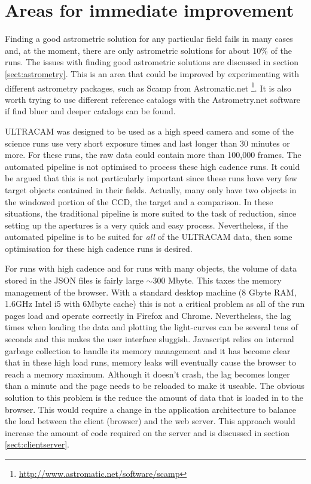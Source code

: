 \section{Areas for immediate improvement}
Finding a good astrometric solution for any particular field fails in many cases and, at the moment, there are only astrometric solutions for about 10\% of the runs. The issues with finding good astrometric solutions are discussed in section \ref{sect:astrometry}. This is an area that could be improved by experimenting with different astrometry packages, such as Scamp from Astromatic.net \footnote{\url{http://www.astromatic.net/software/scamp}}. It is also worth trying to use different reference catalogs with the Astrometry.net software if find bluer and deeper catalogs can be found. 

ULTRACAM was designed to be used as a high speed camera and some of the science runs use very short exposure times and last longer than 30 minutes or more. For these runs,  the raw data could contain more than 100,000 frames. The automated pipeline is not optimised to process these high cadence runs. It could be argued that this is not particularly important since these runs have very few target objects contained in their fields. Actually, many only have two objects in the windowed portion of the CCD, the target and a comparison. In these situations, the traditional pipeline is more suited to the task of reduction, since setting up the apertures is a very quick and easy process. Nevertheless, if the automated pipeline is to be suited for \emph{all} of the ULTRACAM data, then some optimisation for these high cadence runs is desired. 

For runs with high cadence and for runs with many objects, the volume of data stored in the JSON files is fairly large $\sim 300$ Mbyte. This taxes the memory management of the browser. With a standard desktop machine (8 Gbyte RAM, 1.6GHz Intel i5 with 6Mbyte cache) this is not a critical problem as all of the run pages load and operate correctly in Firefox and Chrome. Nevertheless, the lag times when loading the data and plotting the light-curves can be several tens of seconds and this makes the user interface sluggish. Javascript relies on internal garbage collection to handle its memory management and it has become clear that in these high load runs, memory leaks will eventually cause the browser to reach a memory maximum. Although it doesn't crash, the lag becomes longer than a minute and the page needs to be reloaded to make it useable. The obvious solution to this problem is the reduce the amount of data that is loaded in to the browser. This would require a change in the application architecture to balance the load between the client (browser) and the web server. This approach would increase the amount of code required on the server and is discussed in section \ref{sect:clientserver}.  

